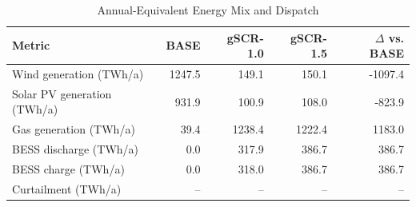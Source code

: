 \begin{table}[!t]
\centering
\caption{Annual-Equivalent Energy Mix and Dispatch}
\label{tab:energy_mix}
\renewcommand{\arraystretch}{1.08}
\begin{tabular}{lrrrr}
\toprule
Metric & BASE & gSCR-1.0 & gSCR-1.5 & \(\Delta\) vs. BASE \\
\midrule
Wind generation (TWh/a)        & 1247.5 & 149.1 & 150.1 & -1097.4 \\
Solar PV generation (TWh/a)    & 931.9 & 100.9 & 108.0 & -823.9 \\
Gas generation (TWh/a)         & 39.4 & 1238.4 & 1222.4 & 1183.0 \\
BESS discharge (TWh/a)         & 0.0 & 317.9 & 386.7 & 386.7 \\
BESS charge (TWh/a)            & 0.0 & 318.0 & 386.7 & 386.7 \\
Curtailment (TWh/a)            & -- & -- & -- & -- \\
\bottomrule
\end{tabular}
\end{table}

